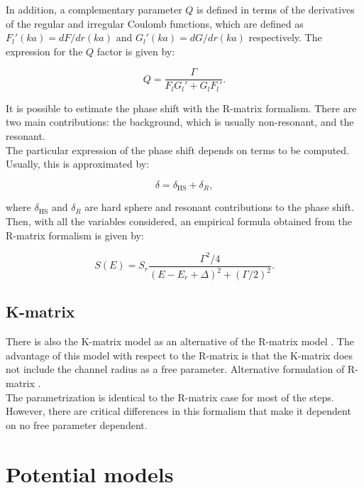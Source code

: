 \documentclass[openany]{book}
\begin{document}
In addition, a complementary parameter $Q$ is defined in terms of the derivatives of the regular and irregular Coulomb functions, which are defined as $F_l'(ka) = dF/dr(ka)$ and $G_l'(ka) = dG/dr(ka)$ respectively. The expression for the $Q$ factor is given by: 

\begin{equation} \label{eq:rmatrix_QFactor}
	Q = \frac{\Gamma}{F_lG_l' + G_lF_l'}.
\end{equation}

It is possible to estimate the phase shift with the R-matrix formalism. There are two main contributions: the background, which is usually non-resonant, and the resonant. \\

The particular expression of the phase shift depends on terms to be computed. Usually, this is approximated by:

\begin{equation}  \label{eq:rmatrix_phaseShift}
	\delta = \delta_{\mathrm{HS}} + \delta_R,
\end{equation}

where $\delta_{\mathrm{HS}}$ and $\delta_R$ are hard sphere and resonant contributions to the phase shift. \\

Then, with all the variables considered, an empirical formula obtained from the R-matrix formalism is given by:

\begin{equation} \label{eq:rmatrix_sfactor}
	S(E) = S_r \frac{\Gamma^2/4}{(E-E_r + \Delta)^2 + (\Gamma/2)^2}.
\end{equation}

\subsection{K-matrix} \label{sub:kmatrix}

There is also the K-matrix model as an alternative of the R-matrix model \cite{humblet_1990}. The advantage of this model with respect to the R-matrix is that the K-matrix does not include the channel radius as a free parameter.  Alternative formulation of R-matrix \cite{brune_2002}. \\

The parametrization is identical to the R-matrix case for most of the steps. However, there are critical differences in this formalism that make it dependent on no free parameter dependent. 

\section{Potential models} \label{sec:potentialModels}
\end{document}
